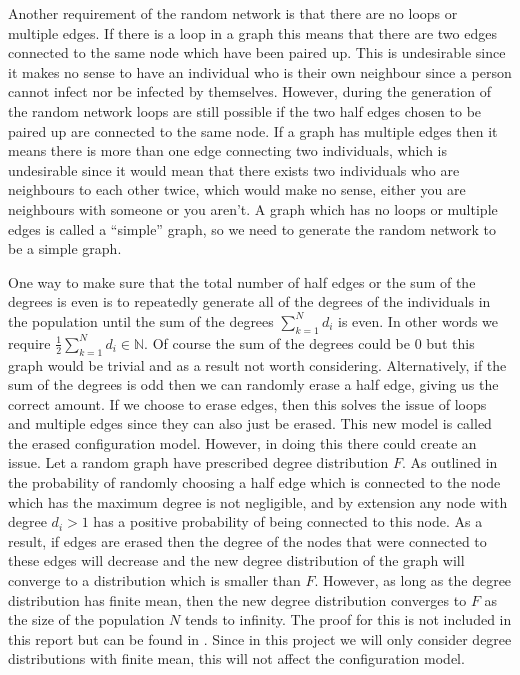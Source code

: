 \documentclass{uonmathsreport}
\begin{document}
Another requirement of the random network is that there are no loops or multiple edges. If there is a loop in a graph this means that there are two edges connected to the same node which have been paired up. This is undesirable since it makes no sense to have an individual who is their own neighbour since a person cannot infect nor be infected by themselves. However, during the generation of the random network loops are still possible if the two half edges chosen to be paired up are connected to the same node. If a graph has multiple edges then it means there is more than one edge connecting two individuals, which is undesirable since it would mean that there exists two individuals who are neighbours to each other twice, which would make no sense, either you are neighbours with someone or you aren’t. A graph which has no loops or multiple edges is called a ``simple” graph, so we need to generate the random network to be a simple graph. 

One way to make sure that the total number of half edges or the sum of the degrees is even is to repeatedly generate all of the degrees of the individuals in the population until the sum of the degrees $\sum_{k=1}^{N} d_i$ is even. In other words we require $ \frac{1}{2} \sum_{k=1}^{N} d_i \in \mathbb{N}$. Of course the sum of the degrees could be $0$ but this graph would be trivial and as a result not worth considering. Alternatively, if the sum of the degrees is odd then we can randomly erase a half edge, giving us the correct amount. If we choose to erase edges, then this solves the issue of loops and multiple edges since they can also just be erased. This new model is called the erased configuration model. However, in doing this there could create an issue. Let a random graph have prescribed degree distribution $F$. As outlined in \cite{bibbritton} the probability of randomly choosing a half edge which is connected to the node which has the maximum degree is not negligible, and by extension any node with degree $d_i>1$ has a positive probability of being connected to this node. As a result, if edges are erased then the degree of the nodes that were connected to these edges will decrease and the new degree distribution of the graph will converge to a distribution which is smaller than $F$. However, as long as the degree distribution has finite mean, then the new degree distribution converges to $F$ as the size of the population $N$ tends to infinity. The proof for this is not included in this report but can be found in \cite{bibbritton}. Since in this project we will only consider degree distributions with finite mean, this will not affect the configuration model.
\end{document}
